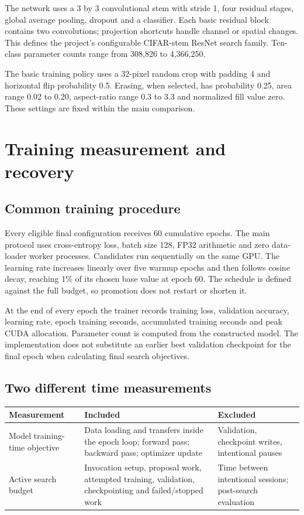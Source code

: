 \documentclass[11pt,a4paper,oneside]{report}
\begin{document}
The network uses a 3 by 3 convolutional stem with stride 1, four residual stages, global average pooling, dropout and a classifier. Each basic residual block contains two convolutions; projection shortcuts handle channel or spatial changes. This defines the project's configurable CIFAR-stem ResNet search family. Ten-class parameter counts range from 308,826 to 4,366,250.

The basic training policy uses a 32-pixel random crop with padding 4 and horizontal flip probability 0.5. Erasing, when selected, has probability 0.25, area range 0.02 to 0.20, aspect-ratio range 0.3 to 3.3 and normalized fill value zero. These settings are fixed within the main comparison.
\section{Training measurement and recovery}
\subsection{Common training procedure}

Every eligible final configuration receives 60 cumulative epochs. The main protocol uses cross-entropy loss, batch size 128, FP32 arithmetic and zero data-loader worker processes. Candidates run sequentially on the same GPU. The learning rate increases linearly over five warmup epochs and then follows cosine decay, reaching 1\% of its chosen base value at epoch 60. The schedule is defined against the full budget, so promotion does not restart or shorten it.

At the end of every epoch the trainer records training loss, validation accuracy, learning rate, epoch training seconds, accumulated training seconds and peak CUDA allocation. Parameter count is computed from the constructed model. The implementation does not substitute an earlier best validation checkpoint for the final epoch when calculating final search objectives.

\subsection{Two different time measurements}

\begin{table}[H]
\centering\small
\renewcommand{\arraystretch}{1.18}
\begin{tabularx}{\textwidth}{>{\raggedright\arraybackslash}X>{\raggedright\arraybackslash}X>{\raggedright\arraybackslash}X}
\toprule
\textbf{Measurement} & \textbf{Included} & \textbf{Excluded} \\
\midrule
Model training-time objective & Data loading and transfers inside the epoch loop; forward pass; backward pass; optimizer update & Validation, checkpoint writes, intentional pauses \\
Active search budget & Invocation setup, proposal work, attempted training, validation, checkpointing and failed/stopped work & Time between intentional sessions; post-search evaluation \\
\bottomrule
\end{tabularx}
\end{table}
\end{document}
